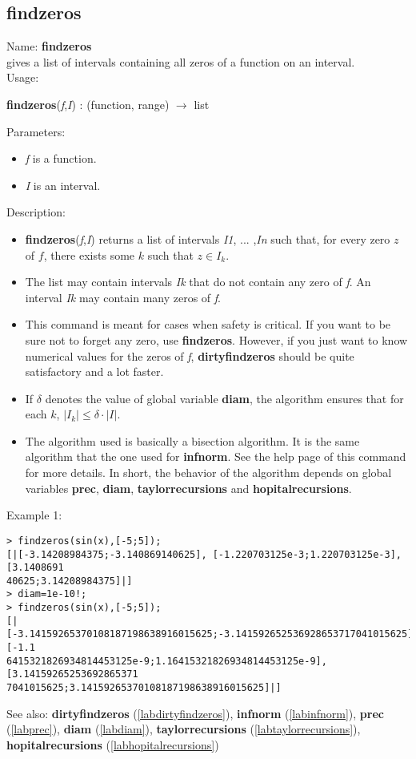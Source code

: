 \subsection{findzeros}
\label{labfindzeros}
\noindent Name: \textbf{findzeros}\\
gives a list of intervals containing all zeros of a function on an interval.\\
\noindent Usage: 
\begin{center}
\textbf{findzeros}(\emph{f},\emph{I}) : (\textsf{function}, \textsf{range}) $\rightarrow$ \textsf{list}
\end{center}
Parameters: 
\begin{itemize}
\item \emph{f} is a function.
\item \emph{I} is an interval.
\end{itemize}
\noindent Description: \begin{itemize}

\item \textbf{findzeros}(\emph{f},\emph{I}) returns a list of intervals \emph{I1}, ... ,\emph{In} such that, for 
   every zero $z$ of $f$, there exists some $k$ such that $z \in I_k$.

\item The list may contain intervals \emph{Ik} that do not contain any zero of \emph{f}.
   An interval \emph{Ik} may contain many zeros of \emph{f}.

\item This command is meant for cases when safety is critical. If you want to be sure
   not to forget any zero, use \textbf{findzeros}. However, if you just want to know 
   numerical values for the zeros of \emph{f}, \textbf{dirtyfindzeros} should be quite 
   satisfactory and a lot faster.

\item If $\delta$ denotes the value of global variable \textbf{diam}, the algorithm ensures
   that for each $k$, $|I_k| \le \delta \cdot |I|$.

\item The algorithm used is basically a bisection algorithm. It is the same algorithm
   that the one used for \textbf{infnorm}. See the help page of this command for more 
   details. In short, the behavior of the algorithm depends on global variables
   \textbf{prec}, \textbf{diam}, \textbf{taylorrecursions} and \textbf{hopitalrecursions}.
\end{itemize}
\noindent Example 1: 
\begin{center}\begin{minipage}{15cm}\begin{Verbatim}[frame=single]
> findzeros(sin(x),[-5;5]);
[|[-3.14208984375;-3.140869140625], [-1.220703125e-3;1.220703125e-3], [3.1408691
40625;3.14208984375]|]
> diam=1e-10!;
> findzeros(sin(x),[-5;5]);
[|[-3.14159265370108187198638916015625;-3.141592652536928653717041015625], [-1.1
6415321826934814453125e-9;1.16415321826934814453125e-9], [3.14159265253692865371
7041015625;3.14159265370108187198638916015625]|]
\end{Verbatim}
\end{minipage}\end{center}
See also: \textbf{dirtyfindzeros} (\ref{labdirtyfindzeros}), \textbf{infnorm} (\ref{labinfnorm}), \textbf{prec} (\ref{labprec}), \textbf{diam} (\ref{labdiam}), \textbf{taylorrecursions} (\ref{labtaylorrecursions}), \textbf{hopitalrecursions} (\ref{labhopitalrecursions})
